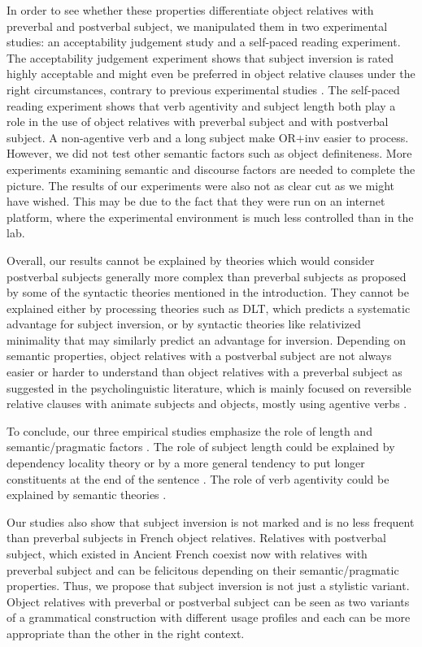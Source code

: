 \documentclass[output=paper]{langscibook}
\begin{document}
In order to see whether these properties differentiate object relatives with preverbal and postverbal subject, we manipulated them in two experimental studies: an acceptability judgement study and a self-paced reading experiment. The acceptability judgement experiment shows that subject inversion is rated highly acceptable and might even be preferred in object relative clauses under the right circumstances, contrary to previous experimental studies \citep{Holmes1981, pozniak2015processing}. The self-paced reading experiment shows that verb agentivity and subject length both play a role in the use of object relatives with preverbal subject and with postverbal subject. A non-agentive verb and a long subject make OR$+$inv easier to process. However, we did not test other semantic factors such as object definiteness. More experiments examining semantic and discourse factors are needed to complete the picture. The results of our experiments were also not as clear cut as we might have wished. This may be due to the fact that they were run on an internet platform, where the experimental environment is much less controlled than in the lab.

Overall, our results cannot be explained by theories which would consider postverbal subjects generally more complex than preverbal subjects as proposed by some of the syntactic theories mentioned in the introduction. They cannot be explained either by processing theories such as DLT, which predicts a systematic advantage for subject inversion, or by syntactic theories like relativized minimality that may similarly predict an advantage for inversion.  Depending on semantic properties, object relatives with a postverbal subject are not always easier or harder to understand than object relatives with a preverbal subject as suggested in the psycholinguistic literature, which is mainly focused on reversible relative clauses with animate subjects and objects, mostly using agentive verbs \citep{Holmes1981, pozniak2015processing}.

To conclude, our three empirical studies emphasize the role of length and semantic/pragmatic factors \citep{mak2006animacy, traxler2002}. The role of subject length could be explained by dependency locality theory \citep{gibson2000} or by a more general tendency to put longer constituents at the end of the sentence \citep{Behaghel, wasow2002postverbal}.  The role of verb agentivity could be explained by semantic theories \citep{Fuchs2006, marandin2011}. 

Our studies also show that subject inversion is not marked and is no less frequent than preverbal subjects in French object relatives. Relatives with postverbal subject, which existed in Ancient French \citep{buridant1999ordre, fuchs2006franccais} coexist now with relatives with preverbal subject and can be felicitous depending on their semantic/pragmatic properties. Thus, we propose that subject inversion is not just a stylistic variant. Object relatives with preverbal or postverbal subject can be seen as two variants of a grammatical construction with different usage profiles and each can be more appropriate than the other in the right context.
\end{document}

